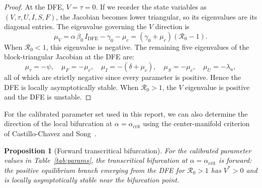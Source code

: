 \documentclass[11pt]{article}
\newtheorem{proposition}{Proposition}
\begin{document}
\begin{proof}
At the DFE, $V = \tau = 0$. If we reorder the state variables as $(V,\tau,U,I,S,F)$, the Jacobian becomes lower triangular, so its eigenvalues are its diagonal entries. The eigenvalue governing the $V$ direction is
\[
\mu_V = \alpha\,\beta_0\,I_{\mathrm{DFE}} - \gamma_0 - \mu_c = (\gamma_0 + \mu_c)(\mathcal{R}_0 - 1).
\]
When $\mathcal{R}_0 < 1$, this eigenvalue is negative. The remaining five eigenvalues of the block-triangular Jacobian at the DFE are:
\[
\mu_\tau = -\psi, \quad
\mu_F = -\mu_c, \quad
\mu_I = -(\delta + \mu_c), \quad
\mu_S = -\mu_c, \quad
\mu_U = -\lambda_u,
\]
all of which are strictly negative since every parameter is positive. Hence the DFE is locally asymptotically stable. When $\mathcal{R}_0 > 1$, the $V$ eigenvalue is positive and the DFE is unstable.
\end{proof}

For the calibrated parameter set used in this report, we can also determine the direction of the local bifurcation at $\alpha = \alpha_{\mathrm{crit}}$ using the center-manifold criterion of Castillo-Chavez and Song~\cite{castilloChavez2004}.

\begin{proposition}[Forward transcritical bifurcation]
\label{prop:forward}
For the calibrated parameter values in Table~\ref{tab:params}, the transcritical bifurcation at $\alpha = \alpha_{\mathrm{crit}}$ is forward: the positive equilibrium branch emerging from the DFE for $\mathcal{R}_0 > 1$ has $V^* > 0$ and is locally asymptotically stable near the bifurcation point.
\end{proposition}
\end{document}
